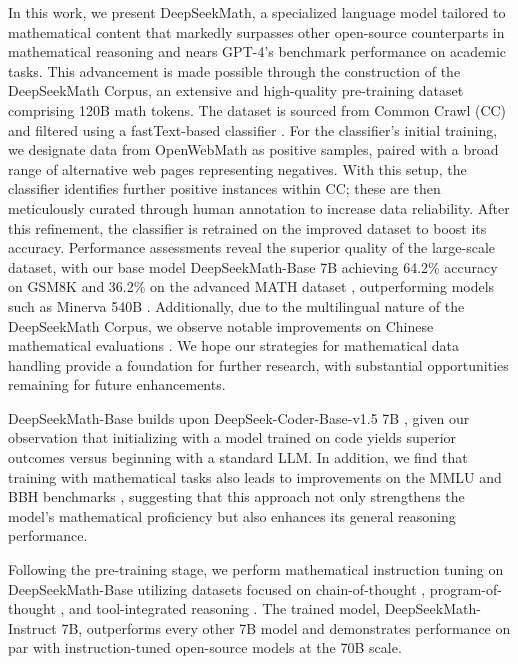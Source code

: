 In this work, we present DeepSeekMath, a specialized language model tailored to mathematical content that markedly surpasses other open-source counterparts in mathematical reasoning and nears GPT-4’s benchmark performance on academic tasks. This advancement is made possible through the construction of the DeepSeekMath Corpus, an extensive and high-quality pre-training dataset comprising 120B math tokens. The dataset is sourced from Common Crawl (CC) and filtered using a fastText-based classifier \citep{joulin2016fasttext}. For the classifier’s initial training, we designate data from OpenWebMath \citep{openwebmath} as positive samples, paired with a broad range of alternative web pages representing negatives. With this setup, the classifier identifies further positive instances within CC; these are then meticulously curated through human annotation to increase data reliability. After this refinement, the classifier is retrained on the improved dataset to boost its accuracy. Performance assessments reveal the superior quality of the large-scale dataset, with our base model DeepSeekMath-Base 7B achieving 64.2\% accuracy on GSM8K \citep{gsm8k} and 36.2\% on the advanced MATH dataset \citep{MATH}, outperforming models such as Minerva 540B \citep{minerva}. Additionally, due to the multilingual nature of the DeepSeekMath Corpus, we observe notable improvements on Chinese mathematical evaluations \citep{wei2023cmath,agieval}. We hope our strategies for mathematical data handling provide a foundation for further research, with substantial opportunities remaining for future enhancements.

DeepSeekMath-Base builds upon DeepSeek-Coder-Base-v1.5 7B \citep{deepseek-coder}, given our observation that initializing with a model trained on code yields superior outcomes versus beginning with a standard LLM. In addition, we find that training with mathematical tasks also leads to improvements on the MMLU \citep{mmlu} and BBH benchmarks \citep{bbh}, suggesting that this approach not only strengthens the model’s mathematical proficiency but also enhances its general reasoning performance.

Following the pre-training stage, we perform mathematical instruction tuning on DeepSeekMath-Base utilizing datasets focused on chain-of-thought \citep{cot}, program-of-thought \citep{pot,pal}, and tool-integrated reasoning \citep{tora}. The trained model, DeepSeekMath-Instruct 7B, outperforms every other 7B model and demonstrates performance on par with instruction-tuned open-source models at the 70B scale.

